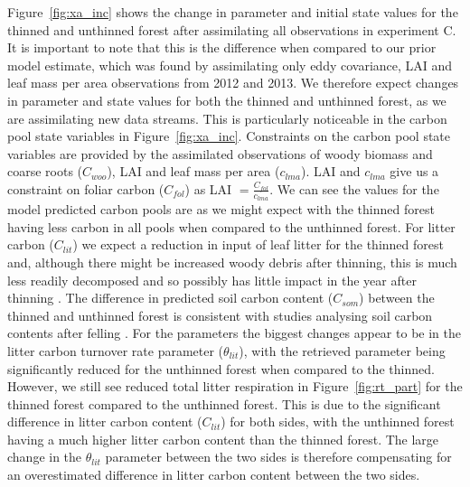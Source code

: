 \documentclass[draft,linenumbers]{agujournal}
\begin{document}
Figure~\ref{fig:xa_inc} shows the change in parameter and initial state values for the thinned and unthinned forest after assimilating all observations in experiment C. It is important to note that this is the difference when compared to our prior model estimate, which was found by assimilating only eddy covariance, LAI and leaf mass per area observations from 2012 and 2013. We therefore expect changes in parameter and state values for both the thinned and unthinned forest, as we are assimilating new data streams. This is particularly noticeable in the carbon pool state variables in Figure~\ref{fig:xa_inc}. Constraints on the carbon pool state variables are provided by the assimilated observations of woody biomass and coarse roots (\(C_{woo}\)), LAI and leaf mass per area (\(c_{lma}\)). LAI and \(c_{lma}\) give us a constraint on foliar carbon (\(C_{fol}\)) as LAI \(= \frac{C_{fol}}{c_{lma}} \). We can see the values for the model predicted carbon pools are as we might expect with the thinned forest having less carbon in all pools when compared to the unthinned forest. For litter carbon (\(C_{lit}\)) we expect a reduction in input of leaf litter for the thinned forest and, although there might be increased woody debris after thinning, this is much less readily decomposed and so possibly has little impact in the year after thinning \citep{wilkinson2016}. The difference in predicted soil carbon content (\(C_{som}\)) between the thinned and unthinned forest is consistent with studies analysing soil carbon contents after felling \citep{Hernesmaa2005777}. For the parameters the biggest changes appear to be in the litter carbon turnover rate parameter (\(\theta_{lit}\)), with the retrieved parameter being significantly reduced for the unthinned forest when compared to the thinned. However, we still see reduced total litter respiration in Figure~\ref{fig:rt_part} for the thinned forest compared to the unthinned forest. This is due to the significant difference in litter carbon content (\(C_{lit}\)) for both sides, with the unthinned forest having a much higher litter carbon content than the thinned forest. The large change in the \(\theta_{lit}\) parameter between the two sides is therefore compensating for an overestimated difference in litter carbon content between the two sides.    
 \clearpage
 
 
\end{document}
